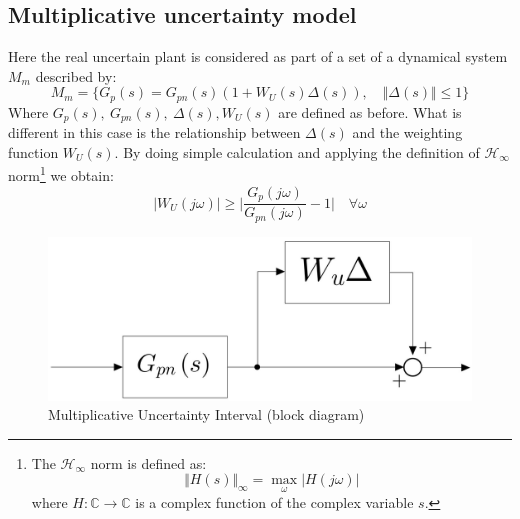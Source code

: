 \documentclass[a4paper, 12pt]{article}
\begin{document}
    \subsection{Multiplicative uncertainty model}
    Here the real uncertain plant is considered as part of a set of a dynamical system $M_m$ described by: 
    \begin{equation}
        M_m = \{
            G_p(s) = G_{pn}(s) (1 + W_U(s) \Delta(s)), \quad 
            \Vert \Delta(s) \Vert \le 1
        \}
    \end{equation}
    Where $G_p(s), \ G_{pn}(s), \ \Delta(s), W_U(s)$ are defined as before. What is different in this case is the relationship between $\Delta(s)$ and the weighting function $W_U(s)$. By doing simple calculation and applying the definition of $\mathcal{H}_\infty$ norm\footnote{
        The $\mathcal{H}_\infty$ norm is defined as:
        \begin{equation*}
            \Vert H(s) \Vert_\infty 
        = \max_{\omega} \vert H(j\omega) \vert
        \end{equation*}
        where $H: \mathbb{C} \to \mathbb{C}$ is a complex function of the complex variable $s$.
    } we obtain:
    \begin{equation} \label{eq:cloud_m}
        \vert W_U(j\omega) \vert \ge
        \bigg\vert
            \frac{G_p(j\omega)}{G_{pn}(j\omega)}-1
        \bigg\vert \quad \forall \omega
    \end{equation}
    
    \begin{figure}[h]
        \centering
        \includegraphics[scale=0.2]{img/Multiplicative.jpeg}
        \caption{Multiplicative Uncertainty Interval (block diagram)}
    \end{figure}
\end{document}
